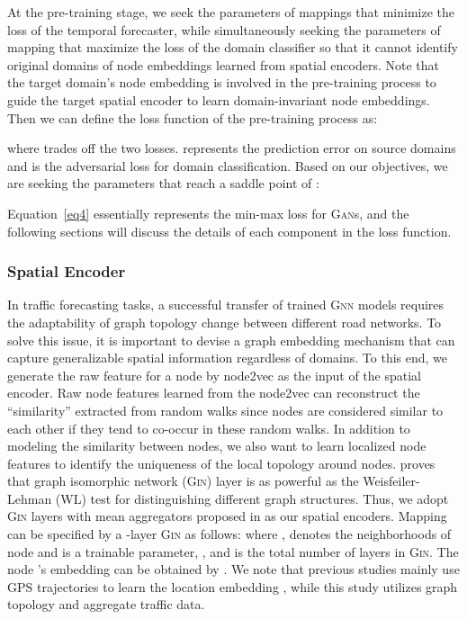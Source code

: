 \documentclass[sigconf]{acmart}
\theoremstyle{definition}
\begin{document}
At the pre-training stage, we seek the parameters  of mappings  that minimize the loss of the temporal forecaster, while simultaneously seeking the parameters  of mapping  that maximize the loss of the domain classifier so that it cannot identify original domains of node embeddings learned from spatial encoders. 
Note that the target domain's node embedding is involved in the pre-training process to guide the target spatial encoder to learn domain-invariant node embeddings. Then we can define the loss function of the pre-training process as:


where  trades off the two losses.   represents the prediction error on source domains and  is the adversarial loss for domain classification. Based on our objectives, we are seeking the parameters  that reach a saddle point of :

Equation~\ref{eq4} essentially represents the min-max loss for \textsc{Gan}s, and the following sections will discuss the details of each component in the loss function.

\subsubsection{Spatial Encoder}
In traffic forecasting tasks, a successful transfer of trained \textsc{Gnn} models requires the adaptability of graph topology change between different road networks. To solve this issue, it is important to devise a graph embedding mechanism that can capture generalizable spatial information regardless of domains. To this end, we generate the raw feature  for a node  by node2vec \cite{grover2016node2vec} as the input of the spatial encoder. Raw node features learned from the node2vec can reconstruct the ``similarity'' extracted from random walks since nodes are considered similar to each other if they tend to co-occur in these random walks. 
In addition to modeling the similarity between nodes, we also want to learn localized node features to identify the uniqueness of the local topology around nodes. 
\cite{xu2018powerful} proves that graph isomorphic network (\textsc{Gin}) layer is as powerful as the Weisfeiler-Lehman (WL) test \cite{weisfeiler1968reduction} for distinguishing different graph structures. Thus, we adopt \textsc{Gin} layers with mean aggregators proposed in \cite{xu2018powerful} as our spatial encoders. Mapping  can be specified by a -layer \textsc{Gin} as follows:
where ,  denotes the neighborhoods of node  and  is a trainable parameter, , and  is the total number of layers in \textsc{Gin}. The node 's embedding can be obtained by . We note that previous studies mainly use GPS trajectories to learn the location embedding \cite{wu2020learning, chen2021robust}, while this study utilizes graph topology and aggregate traffic data.
\end{document}
